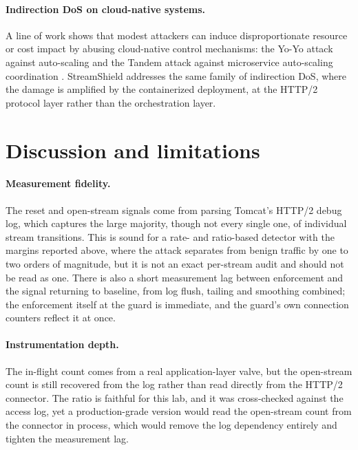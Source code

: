 \documentclass[a4paper,fleqn]{cas-dc}
\begin{document}
\paragraph{Indirection DoS on cloud-native systems.} A line of work shows that modest attackers can induce disproportionate resource or cost impact by abusing cloud-native control mechanisms: the Yo-Yo attack against auto-scaling \cite{yoyo} and the Tandem attack against microservice auto-scaling coordination \cite{tandem}. StreamShield addresses the same family of indirection DoS, where the damage is amplified by the containerized deployment, at the HTTP/2 protocol layer rather than the orchestration layer.

\section{Discussion and limitations}\label{sec:discussion}

\paragraph{Measurement fidelity.} The reset and open-stream signals come from parsing Tomcat's HTTP/2 debug log, which captures the large majority, though not every single one, of individual stream transitions. This is sound for a rate- and ratio-based detector with the margins reported above, where the attack separates from benign traffic by one to two orders of magnitude, but it is not an exact per-stream audit and should not be read as one. There is also a short measurement lag between enforcement and the signal returning to baseline, from log flush, tailing and smoothing combined; the enforcement itself at the guard is immediate, and the guard's own connection counters reflect it at once.

\paragraph{Instrumentation depth.} The in-flight count comes from a real application-layer valve, but the open-stream count is still recovered from the log rather than read directly from the HTTP/2 connector. The ratio is faithful for this lab, and it was cross-checked against the access log, yet a production-grade version would read the open-stream count from the connector in process, which would remove the log dependency entirely and tighten the measurement lag.
\end{document}
